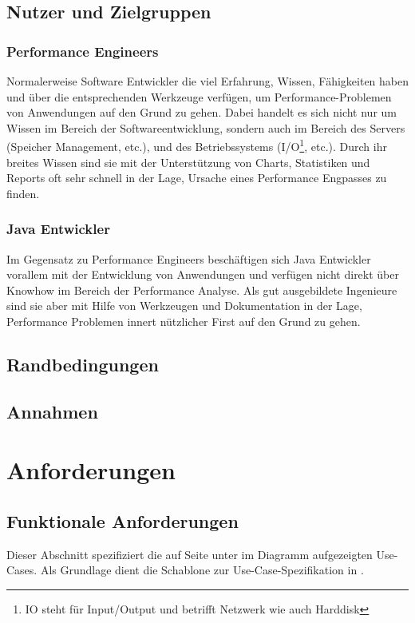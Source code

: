 \subsection{Nutzer und Zielgruppen}
\subsubsection{Performance Engineers}
Normalerweise Software Entwickler die viel Erfahrung, Wissen, Fähigkeiten haben und über die entsprechenden Werkzeuge verfügen, um Performance-Problemen von Anwendungen auf den Grund zu gehen. Dabei handelt es sich nicht nur um Wissen im Bereich der Softwareentwicklung, sondern auch im Bereich des Servers (Speicher Management, etc.), und des Betriebssystems (I/O\footnote{IO steht für Input/Output und betrifft Netzwerk wie auch Harddisk}, etc.). Durch ihr breites Wissen sind sie mit der Unterstützung von Charts, Statistiken und Reports oft sehr schnell in der Lage, Ursache eines Performance Engpasses zu finden.

\subsubsection{Java Entwickler}
Im Gegensatz zu Performance Engineers beschäftigen sich Java Entwickler vorallem mit der Entwicklung von Anwendungen und verfügen nicht direkt über Knowhow im Bereich der Performance Analyse. Als gut ausgebildete Ingenieure sind sie aber mit Hilfe von Werkzeugen und Dokumentation in der Lage, Performance Problemen innert nützlicher First auf den Grund zu gehen.

\subsection{Randbedingungen}
\subsection{Annahmen}
\section{Anforderungen}
\subsection{Funktionale Anforderungen}
Dieser Abschnitt spezifiziert die auf Seite \pageref{systemfunktionalitaet} unter  im Diagramm aufgezeigten Use-Cases. Als Grundlage dient die Schablone zur Use-Case-Spezifikation in \cite[S. 78-79]{pohl2010basiswissen}.



